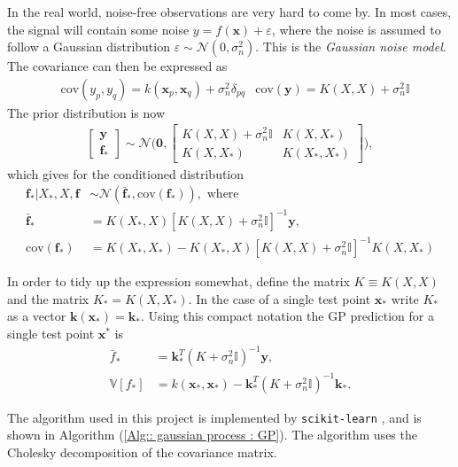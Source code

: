 \documentclass[twoside,english]{uiofysmaster}
\begin{document}
In the real world, noise-free observations are very hard to come by. In most cases, the signal will contain some noise $y = f(\textbf{x}) + \varepsilon$, where the noise is assumed to follow a Gaussian distribution $\varepsilon \sim \mathcal{N}(0, \sigma_n^2)$. This is the \textit{Gaussian noise model}. The covariance can then be expressed as
\begin{align}
&\text{cov}(y_p, y_q) = k(\textbf{x}_p, \textbf{x}_q) + \sigma_n^2 \delta_{pq} &\text{cov}(\textbf{y}) = K(X, X) + \sigma_n^2 \mathbb{I}
\end{align}
The prior distribution is now
\begin{align}
\begin{bmatrix}
\textbf{y}\\
\textbf{f}_*
\end{bmatrix}
\sim 
\mathcal{N} \Bigg(
\boldsymbol{0},
\begin{bmatrix}
K(X, X) + \sigma_n^2 \mathbb{I} & K(X, X_*)\\
K(X, X_*) & K(X_*, X_*)
\end{bmatrix}
 \Bigg),
\end{align}
which gives for the conditioned distribution 
\begin{align}
\textbf{f}_* \big| X_*, X, \textbf{f} & \sim \mathcal{N}(\bar{\textbf{f}}_*, \text{cov}(\textbf{f}_*)), \text{ where}\\
\bar{\textbf{f}}_* &= K(X_*, X) [K(X, X) + \sigma_n^2 \mathbb{I}]^{-1} \textbf{y},\\
\text{cov} (\textbf{f}_*) &= K(X_*, X_*) - K(X_*, X)[K(X, X) + \sigma_n^2 \mathbb{I}]^{-1} K(X, X_*)
\end{align}

In order to tidy up the expression somewhat, define the matrix $K \equiv K(X, X)$ and the matrix $K_* = K(X, X_*)$. In the case of a single test point $\textbf{x}_*$ write $K_*$ as a vector $\textbf{k}(\textbf{x}_*) = \textbf{k}_*$. Using this compact notation the GP prediction for a single test point $\textbf{x}^*$ is
\begin{align}
\bar{f}_* &= \textbf{k}_*^T(K + \sigma_n^2\mathbb{I})^{-1} \textbf{y},\label{1}\\
\mathbb{V}[f_*] &= k(\textbf{x}_*, \textbf{x}_*) - \textbf{k}_*^T(K + \sigma_n^2 \mathbb{I})^{-1} \textbf{k}_*.
\end{align}

The algorithm used in this project is implemented by \verb|scikit-learn| \cite{scikit-learn}, and is shown in Algorithm (\ref{Alg:: gaussian process : GP}). The algorithm uses the Cholesky decomposition of the covariance matrix.
\end{document}
